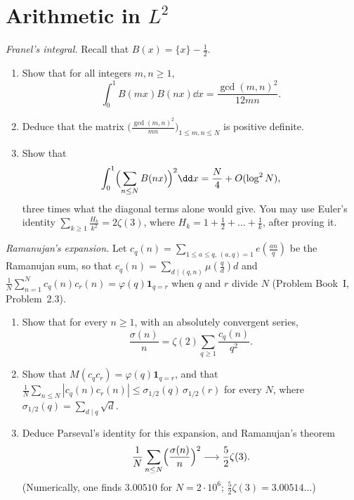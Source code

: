 \section{Arithmetic in \texorpdfstring{$L^2$}{L2}}

\begin{exercise}[$\star\star\star$]\label{pb:franel}
\emph{Franel's integral.} Recall that $B(x)=\{x\}-\frac12$.
\begin{enumerate}[label=(\alph*)]
\item Show that for all integers $m,n\ge1$,
\[
\int_0^1B(mx)B(nx)\dd x=\frac{\gcd(m,n)^2}{12mn}.
\]
\item Deduce that the matrix $\bigl(\frac{\gcd(m,n)^2}{mn}\bigr)_{1\le m,n\le N}$ is positive definite.
\item Show that
\[
\int_0^1\Bigl(\sum_{n\le N}B(nx)\Bigr)^2\dd x=\frac N4+O(\log^2N),
\]
three times what the diagonal terms alone would give. You may use Euler's identity $\sum_{k\ge1}\frac{H_k}{k^2}=2\zeta(3)$, where $H_k=1+\frac12+\dots+\frac1k$, after
proving it.
\end{enumerate}
\end{exercise}

\begin{exercise}[$\star\star\star$]\label{pb:ramanujan}
\emph{Ramanujan's expansion.} Let $c_q(n)=\sum_{1\le a\le q,\,(a,q)=1}e(\frac{an}q)$ be the Ramanujan sum, so that $c_q(n)=\sum_{d\mid(q,n)}\mu(\frac qd)d$ and
$\frac1N\sum_{n=1}^Nc_q(n)c_r(n)=\varphi(q)\mathbf 1_{q=r}$ when $q$ and $r$ divide $N$ (Problem Book~I, Problem~2.3).
\begin{enumerate}[label=(\alph*)]
\item Show that for every $n\ge1$, with an absolutely convergent series,
\[
\frac{\sigma(n)}n=\zeta(2)\sum_{q\ge1}\frac{c_q(n)}{q^2}.
\]
\item Show that $M(c_qc_r)=\varphi(q)\mathbf 1_{q=r}$, and that $\frac1N\sum_{n\le N}|c_q(n)c_r(n)|\le\sigma_{1/2}(q)\,\sigma_{1/2}(r)$ for every $N$, where
$\sigma_{1/2}(q)=\sum_{d\mid q}\sqrt d$.
\item Deduce Parseval's identity for this expansion, and Ramanujan's theorem
\[
\frac1N\sum_{n\le N}\Bigl(\frac{\sigma(n)}n\Bigr)^2\longrightarrow\frac52\zeta(3).
\]
(Numerically, one finds $3.00510$ for $N=2\cdot10^6$; $\frac52\zeta(3)=3.00514\ldots$)
\end{enumerate}
\end{exercise}

